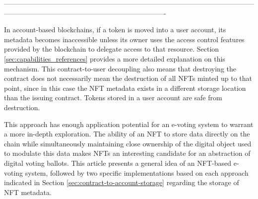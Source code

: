 ----------------------------------------------------------------------------------------------------------------------------------------------------------------------------------

\par
In account-based blockchains, if a token is moved into a user account, its metadata becomes inaccessible unless its owner uses the access control features provided by the blockchain to delegate access to that resource. Section \ref{sec:capabilities_references} provides a more detailed explanation on this mechanism. This contract-to-user decoupling also means that destroying the contract does not necessarily mean the destruction of all NFTs minted up to that point, since in this case the NFT metadata exists in a different storage location than the issuing contract. Tokens stored in a user account are safe from destruction.
\par
This approach has enough application potential for an e-voting system to warrant a more in-depth exploration. The ability of an NFT to store data directly on the chain while simultaneously maintaining close ownership of the digital object used to modulate this data makes NFTs an interesting candidate for an abstraction of digital voting ballots. This article presents a general idea of an NFT-based e-voting system, followed by two specific implementations based on each approach indicated in Section \ref{sec:contract-to-account-storage} regarding the storage of NFT metadata.
